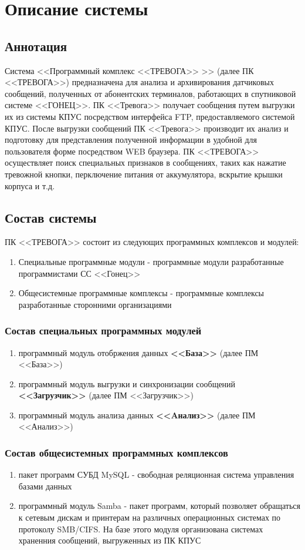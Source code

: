 \documentclass[12pt]{article}[a4paper,14pt,russian]
\begin{document}
	\section{Описание системы}
	\subsection{Аннотация}

	Система <<Программный комплекс <<ТРЕВОГА>> >> (далее ПК <<ТРЕВОГА>>) предназначена для анализа и архивирования датчиковых сообщений, полученных от абонентских терминалов, работающих в спутниковой системе <<ГОНЕЦ>>. ПК <<Тревога>> получает сообщения путем выгрузки их из системы КПУС посредством интерфейса FTP, предоставляемого системой КПУС. После выгрузки сообщений ПК <<Тревога>> производит их анализ и подготовку для представления полученной информации в удобной для пользователя форме посредством WEB браузера. ПК <<ТРЕВОГА>> осуществляет поиск специальных признаков в сообщениях, таких как нажатие тревожной кнопки, перключение питания от аккумулятора, вскрытие крышки корпуса и т.д.
	
	\subsection{Состав системы}
    ПК <<ТРЕВОГА>> состоит из следующих программных комплексов и модулей:
	\begin{enumerate}
	\item  Специальные программные модули - программные модули разработанные программистами  СС <<Гонец>>
	\item  Общесистемные программные комплексы  - программные комплексы разработанные сторонними организациями
	\end{enumerate}
    \subsubsection {Состав специальных программных модулей}
	\begin{enumerate}
	\item программный модуль отобржения данных \textbf{<<База>>} (далее ПМ <<База>>)
	\item программный модуль выгрузки и синхронизации сообщений \textbf{<<Загрузчик>>} (далее ПМ <<Загрузчик>>)
	\item программный модуль анализа данных \textbf{<<Aнализ>>} (далее ПМ <<Анализ>>)
	\end{enumerate}
    \subsubsection {Состав общесистемных программных комплексов}
    \begin{enumerate}
    \item пакет программ СУБД MySQL - свободная реляционная система управления базами данных
    \item программный модуль Samba - пакет программ, который позволяет обращаться к сетевым дискам и принтерам на различных операционных системах по протоколу SMB/CIFS. На базе этого модуля организована системах храненния сообщений, выгруженных из ПК КПУС
    \end{enumerate}
\end{document}
